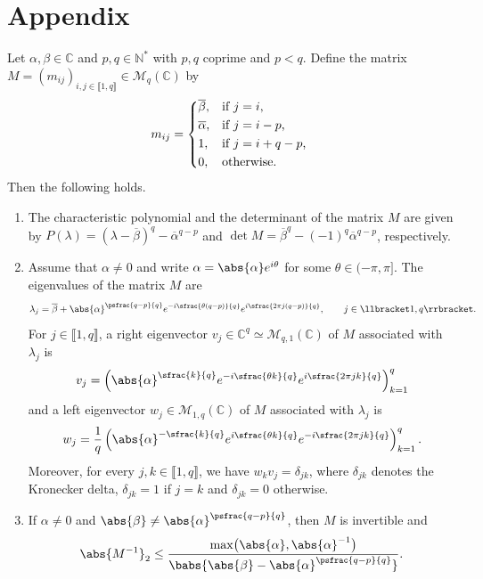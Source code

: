 \appendix

\section*{Appendix}
\label{AppM}

\begin{prop}
\label{AppPropM}
Let $\alpha, \beta \in \mathbb C$ and $p, q \in \mathbb N^\ast$ with $p, q$ coprime and $p < q$. Define the matrix $M = (m_{ij})_{i, j \in \llbracket 1, q\rrbracket} \in \mathcal M_{q}(\mathbb C)$ by
\begin{equation}
\label{DefMij}
m_{ij} =
\begin{dcases*}
\overline\beta, & if $j = i$, \\
\overline\alpha, & if $j = i - p$, \\
1, & if $j = i + q - p$, \\
0, & otherwise.
\end{dcases*}
\end{equation}
Then the following holds.

\begin{enumerate}
\item\label{AppCharactPolyM} The characteristic polynomial and the determinant of the matrix $M$ are given by $P(\lambda) = \left(\lambda - \overline\beta\right)^q - \overline\alpha^{q - p}$ and $\det M = \overline\beta^q - (-1)^q \overline\alpha^{q - p}$, respectively.

\item\label{AppEigenvectorsM} Assume that $\alpha \neq 0$ and write $\alpha = \abs{\alpha} e^{i\theta}$ for some $\theta \in (-\pi, \pi]$. The eigenvalues of the matrix $M$ are
\begin{equation}
\label{EigenvaluesM}
\lambda_j = \overline\beta + \abs{\alpha}^{\psfrac{q - p}{q}} e^{-i\sfrac{\theta(q - p)}{q}} e^{i \sfrac{2\pi j (q - p)}{q}}, \qquad j \in \llbracket 1, q\rrbracket.
\end{equation}
For $j \in \llbracket 1, q\rrbracket$, a right eigenvector $v_j \in \mathbb C^q \simeq \mathcal M_{q, 1}(\mathbb C)$ of $M$ associated with $\lambda_j$ is
\[
v_j = \left(\abs{\alpha}^{\sfrac{k}{q}} e^{-i \sfrac{\theta k}{q}} e^{i \sfrac{2\pi j k}{q}}\right)_{k=1}^q
\]
and a left eigenvector $w_j \in \mathcal M_{1, q}(\mathbb C)$ of $M$ associated with $\lambda_j$ is
\[
w_j = \frac{1}{q} \left(\abs{\alpha}^{-\sfrac{k}{q}} e^{i \sfrac{\theta k}{q}} e^{-i \sfrac{2\pi j k}{q}}\right)_{k=1}^q.
\]
Moreover, for every $j, k \in \llbracket 1, q\rrbracket$, we have $w_k v_j = \delta_{jk}$, where $\delta_{jk}$ denotes the Kronecker delta, \ie $\delta_{jk} = 1$ if $j = k$ and $\delta_{jk} = 0$ otherwise.

\item\label{AppInverseM} If $\alpha \neq 0$ and $\abs{\beta} \neq \abs{\alpha}^{\psfrac{q - p}{q}}$, then $M$ is invertible and
\[\abs{M^{-1}}_{2} \leq \frac{\max\bigl(\abs{\alpha}, \abs{\alpha}^{-1}\bigr)}{\babs{\abs{\beta} - \abs{\alpha}^{\psfrac{q - p}{q}}}}.\]
\end{enumerate}
\end{prop}

